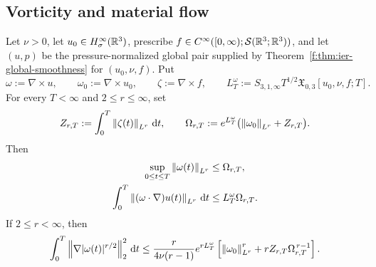 \subsection{Vorticity and material flow}

\begin{theorem}
\label{f:thm:app-vorticity-amplification}
Let \(\nu>0\), let \(u_0\in H^\infty_\sigma(\mathbb R^3)\), prescribe
\(f\in C^\infty([0,\infty);\mathcal S(\mathbb R^3;\mathbb R^3))\), and let \((u,p)\) be the
pressure-normalized global pair supplied by
Theorem~\ref{f:thm:ier-global-smoothness} for \((u_0,\nu,f)\).  Put
\[
 \omega:=\nabla\times u,
 \qquad
 \omega_0:=\nabla\times u_0,
 \qquad
 \zeta:=\nabla\times f,
 \qquad
 L_T^\omega:=S_{3,1,\infty}T^{1/2}
 \mathfrak X_{0,3}[u_0,\nu,f;T].
\]
For every \(T<\infty\) and \(2\le r\le\infty\),
set
\[
 Z_{r,T}:=\int_0^T\left\lVert \zeta(t)\right\rVert_{L^r}\,\mathrm d t,
 \qquad
 \Omega_{r,T}:=
 e^{L_T^\omega}\bigl(\left\lVert \omega_0\right\rVert_{L^r}+Z_{r,T}\bigr).
\]
Then
\begin{align}
 \sup_{0\le t\le T}\left\lVert \omega(t)\right\rVert_{L^r}
 &\le \Omega_{r,T},
 \label{f:eq:app-vorticity-Lr-amplification}\\
 \int_0^T\left\lVert (\omega\cdot\nabla)u(t)\right\rVert_{L^r}\,\mathrm d t
 &\le L_T^\omega\Omega_{r,T}.
 \label{f:eq:app-vortex-stretching-action}
\end{align}
If \(2\le r<\infty\), then
\begin{equation}
 \int_0^T\left\lVert \nabla|\omega(t)|^{r/2}\right\rVert_2^2\,\mathrm d t
 \le \frac{r}{4\nu(r-1)}e^{rL_T^\omega}
 \left[
 \left\lVert \omega_0\right\rVert_{L^r}^r
 +rZ_{r,T}\Omega_{r,T}^{\,r-1}
 \right].
 \label{f:eq:app-vorticity-dissipation}
\end{equation}
\end{theorem}

